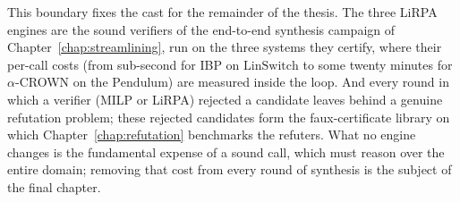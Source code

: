 This boundary fixes the cast for the remainder of the thesis. The three LiRPA
engines are the sound verifiers of the end-to-end synthesis campaign of
Chapter~\ref{chap:streamlining}, run on the three systems they certify, where their per-call costs (from
sub-second for IBP on $\mathrm{LinSwitch}$ to some twenty minutes for
$\alpha$-CROWN on the $\mathrm{Pendulum}$) are measured inside the loop.
And every round in which a verifier (MILP or LiRPA) rejected a candidate
leaves behind a genuine refutation problem; these rejected candidates form the
faux-certificate library on which Chapter~\ref{chap:refutation} benchmarks the
refuters. What no engine changes is the fundamental expense of a sound call,
which must reason over the entire domain; removing that cost from every round
of synthesis is the subject of the final chapter.


